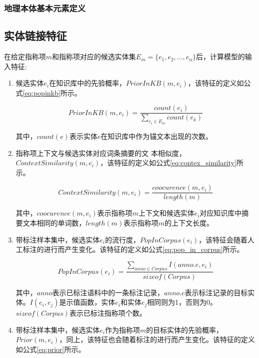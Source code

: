 \subsubsection{地理本体基本元素定义}

\subsection{实体链接特征}\label{section:superised_feature}
在给定指称项$m$和指称项对应的候选实体集$E_m=\{e_1,e_2,...,e_n\}$后，计算模型的输入特征:

\begin{enumerate}
	\renewcommand{\labelenumi}{(\theenumi)}
	\item {候选实体$e_i$在知识库中的先验概率，$PriorInKB(m,e_i)$，该特征的定义如公式\ref{eq:popinkb}所示。
		
		\begin{equation}\label{eq:popinkb}
		PriorInKB(m,e_i)=\frac{count(e_i)}{\sum_{e_i\in E_m} {count(e_k)}}
		\end{equation}
		
		其中，$count(e)$表示实体$e$在知识库中作为锚文本出现的次数。
	}
	\item {指称项上下文与候选实体对应词条摘要的文 本相似度，$ContextSimilarity(m,e_i)$，该特征的定义如公式\ref{eq:contex_similarity}所示。
		
		\begin{equation}\label{eq:contex_similarity}
		ContextSimilarity(m,e_i)=\frac{coocurence(m,e_i)}{length(m)}
		\end{equation}
		
		其中，$coocurence(m,e_i)$表示指称项$m$上下文和候选实体$e_i$对应知识库中摘要文本相同的单词数，$length(m)$表示指称项$m$的上下文长度。
	}
	\item {带标注样本集中，候选实体$e_i$的流行度，$PopInCorpus(e_i)$，该特征会随着人工标注的进行而产生变化。该特征的定义如公式\ref{eq:pop_in_corpus}所示。
		
		\begin{equation}\label{eq:pop_in_corpus}
		PopInCorpus(e_i)=\frac{\sum_{anno \in Corpus} {I(anno.e,e_i)}}{sizeof(Corpus)}
		\end{equation}
		
		其中，$anno$表示已标注语料中的一条标注记录，$anno.e$表示标注记录的目标实体。$I(e_i,e_j)$是示值函数，实体$e_i$和实体$e_j$相同则为1，否则为0。$sizeof(Corpus)$表示已标注指称项个数。
	}
	\item{带标注样本集中，候选实体$e_i$作为指称项$m$的目标实体的先验概率，$Prior(m,e_i)$，同上，该特征也会随着标注的进行而产生变化。该特征的定义如公式\ref{eq:prior}所示。
		
}
\end{enumerate}
